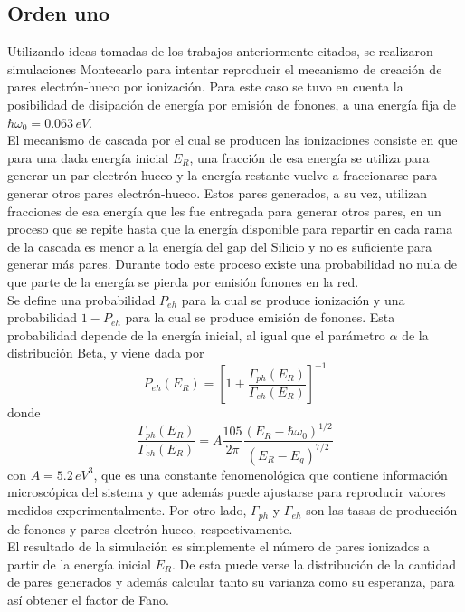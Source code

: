 \subsection*{Orden uno}
\noindent Utilizando ideas tomadas de los trabajos anteriormente citados, se realizaron simulaciones Montecarlo para intentar reproducir el mecanismo de creación de pares electrón-hueco por ionización. Para este caso se tuvo en cuenta la posibilidad de disipación de energía por emisión de fonones, a una energía fija de $\hbar\omega_{0} = 0.063\,eV$.\\
\indent El mecanismo de cascada por el cual se producen las ionizaciones consiste en que para una dada energía inicial $E_{R}$, una fracción de esa energía se utiliza para generar un par electrón-hueco y la energía restante vuelve a fraccionarse para generar otros pares electrón-hueco. Estos pares generados, a su vez, utilizan fracciones de esa energía que les fue entregada para generar otros pares, en un proceso que se repite hasta que la energía disponible para repartir en cada rama de la cascada es menor a la energía del gap del Silicio y no es suficiente para generar más pares. Durante todo este proceso existe una probabilidad no nula de que parte de la energía se pierda por emisión fonones en la red.\\
\indent Se define una probabilidad $P_{eh}$ para la cual se produce ionización y una probabilidad $1 - P_{eh}$ para la cual se produce emisión de fonones. Esta probabilidad depende de la energía inicial, al igual que el parámetro $\alpha$ de la distribución Beta, y viene dada por
\begin{equation}
    P_{eh}(E_{R}) = 
    \left[
        1 + \frac{\Gamma_{ph}(E_{R})}{\Gamma_{eh}(E_{R})}
    \right]^{-1}
        \label{ec:ProbabilidadIonizacion}
\end{equation}
donde 
\begin{equation*}
    \frac{\Gamma_{ph}(E_{R})}{\Gamma_{eh}(E_{R})}
    = A\frac{105}{2\pi}\frac{(E_{R} - \hbar \omega_{0})^{1/2}}{(E_{R} - E_{g})^{7/2}}
\end{equation*}
con $A = 5.2\,eV^{3}$, que es una constante fenomenológica que contiene información microscópica del sistema y que además puede ajustarse para reproducir valores medidos experimentalmente. Por otro lado, $\Gamma_{ph}$ y $\Gamma_{eh}$ son las tasas de producción de fonones y pares electrón-hueco, respectivamente.\\
\indent El resultado de la simulación es simplemente el número de pares ionizados a partir de la energía inicial $E_{R}$. De esta puede verse la distribución de la cantidad de pares generados y además calcular tanto su varianza como su esperanza, para así obtener el factor de Fano.\\
